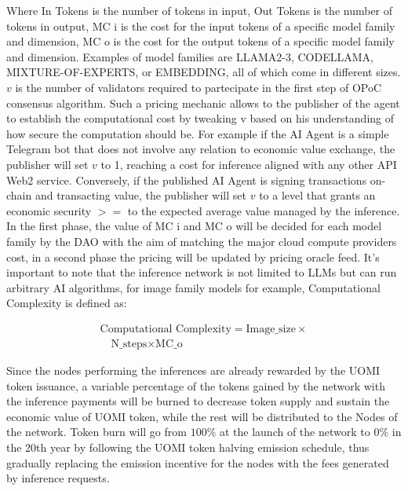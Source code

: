 \documentclass{article}
\begin{document}
Where In Tokens is the number of tokens in input, Out Tokens is the number of tokens in output, MC i is the cost for the input tokens of a specific model family and dimension, MC o is the cost for the output tokens of a specific model family and dimension.  Examples of model families are LLAMA2-3, CODELLAMA,  MIXTURE-OF-EXPERTS, or EMBEDDING, all of which come in different sizes.  \(v\) is the number of validators required to partecipate in the first step of OPoC consensus algorithm. Such a pricing mechanic allows to the publisher of the agent to establish the computational cost by tweaking v based on his understanding of how secure the computation should be. For example if the AI Agent is a simple Telegram bot that does not involve any relation to economic value exchange, the publisher will set \(v\) to 1, reaching a cost for inference aligned with any other API Web2 service. Conversely, if the published AI Agent is signing transactions on-chain and transacting value, the publisher will set \(v\) to a level that grants an economic security \(>=\) to the expected average value managed by the inference. 
In the first phase, the value of MC i and MC o will be decided for each model family by the DAO with the aim of matching the major cloud compute providers cost, in a second phase the pricing will be updated by pricing oracle feed. It's important to note that the inference network is not limited to LLMs but can run arbitrary AI algorithms, for image family models for example, Computational Complexity is defined as: 


\[
\begin{array}{l}
\text{Computational Complexity} = \text{Image\_size} \times \\
\quad \text{N\_steps} \times \text{MC\_o}
\end{array}
\]

Since the nodes performing the inferences are already rewarded by the UOMI token issuance, a variable percentage of the tokens gained by the network with the inference payments will be burned to decrease token supply and sustain the economic value of UOMI token, while the rest will be distributed to the Nodes of the network. 
Token burn will go from \( 100\%\) at the launch of the network to \( 0\%\) in the 20th year by following the UOMI token halving emission schedule, thus gradually replacing the emission incentive for the nodes with the fees generated by inference requests. 
\end{document}
